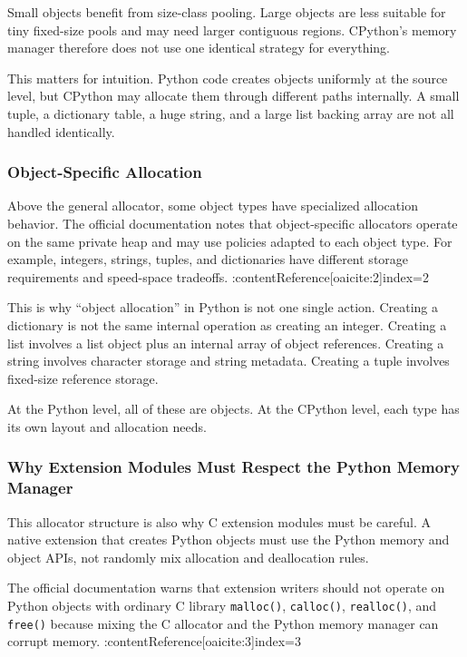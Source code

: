 Small objects benefit from size-class pooling. Large objects are less suitable for tiny fixed-size pools and may need larger contiguous regions. CPython's memory manager therefore does not use one identical strategy for everything.

This matters for intuition. Python code creates objects uniformly at the source level, but CPython may allocate them through different paths internally. A small tuple, a dictionary table, a huge string, and a large list backing array are not all handled identically.

\subsubsection*{Object-Specific Allocation}

Above the general allocator, some object types have specialized allocation behavior. The official documentation notes that object-specific allocators operate on the same private heap and may use policies adapted to each object type. For example, integers, strings, tuples, and dictionaries have different storage requirements and speed-space tradeoffs. :contentReference[oaicite:2]{index=2}

This is why ``object allocation'' in Python is not one single action. Creating a dictionary is not the same internal operation as creating an integer. Creating a list involves a list object plus an internal array of object references. Creating a string involves character storage and string metadata. Creating a tuple involves fixed-size reference storage.

At the Python level, all of these are objects. At the CPython level, each type has its own layout and allocation needs.

\subsubsection*{Why Extension Modules Must Respect the Python Memory Manager}

This allocator structure is also why C extension modules must be careful. A native extension that creates Python objects must use the Python memory and object APIs, not randomly mix allocation and deallocation rules.

The official documentation warns that extension writers should not operate on Python objects with ordinary C library \texttt{malloc()}, \texttt{calloc()}, \texttt{realloc()}, and \texttt{free()} because mixing the C allocator and the Python memory manager can corrupt memory. :contentReference[oaicite:3]{index=3}

